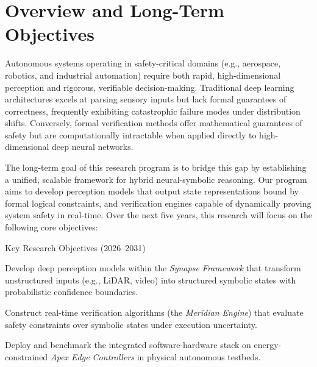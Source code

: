 \section{Overview and Long-Term Objectives}
Autonomous systems operating in safety-critical domains (e.g., aerospace, robotics, and industrial automation) require both rapid, high-dimensional perception and rigorous, verifiable decision-making. Traditional deep learning architectures excels at parsing sensory inputs but lack formal guarantees of correctness, frequently exhibiting catastrophic failure modes under distribution shifts. Conversely, formal verification methods offer mathematical guarantees of safety but are computationally intractable when applied directly to high-dimensional deep neural networks.

The long-term goal of this research program is to bridge this gap by establishing a unified, scalable framework for hybrid neural-symbolic reasoning. Our program aims to develop perception models that output state representations bound by formal logical constraints, and verification engines capable of dynamically proving system safety in real-time. Over the next five years, this research will focus on the following core objectives:

\begin{objectivebox}{Key Research Objectives (2026--2031)}
  \begin{description}[leftmargin=1.2em, labelsep=0.5em, itemsep=4pt]
    \item[\textbf{Objective 1: Neural-Symbolic Perception.}] Develop deep perception models within the \emph{Synapse Framework} that transform unstructured inputs (e.g., LiDAR, video) into structured symbolic states with probabilistic confidence boundaries.
    \item[\textbf{Objective 2: Dynamic Formal Verification.}] Construct real-time verification algorithms (the \emph{Meridian Engine}) that evaluate safety constraints over symbolic states under execution uncertainty.
    \item[\textbf{Objective 3: Edge Hardware Validation.}] Deploy and benchmark the integrated software-hardware stack on energy-constrained \emph{Apex Edge Controllers} in physical autonomous testbeds.
  \end{description}
\end{objectivebox}
